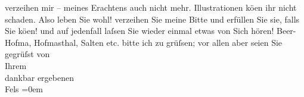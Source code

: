\begin{ledgroupsized}[t]{13cm}
                    verzeihen mir – meines Erachtens auch nicht mehr. Illustrationen kö{\geminationn}en ihr nicht schaden.\pend
           \pstart
           Also leben Sie wohl! verzeihen Sie meine Bitte und erfüllen Sie sie, falls Sie
                        kö{\geminationn}en! und auf jedenfall laſsen Sie wieder
                    einmal etwas von Sich hören! Beer-Hofma{\geminationn}, Hofma{\geminationn}sthal, Salten etc. bitte ich zu
                    grüſsen; vor allen aber seien Sie gegrüſst \pend
           \pstart
           von{\\[\baselineskip]}Ihrem{\\[\baselineskip]}dankbar ergebenen{\\[\baselineskip]}\spacefill\mbox{Fels}\pend
           \leftskip=0em{}          \endnumbering{}\end{ledgroupsized}  \newcommand{\dateiname}{L00488}\newcommand{\titel}{Friedrich M. Fels an Arthur Schnitzler, 19. 9. 1895}\newcommand{\editorInnen}{Martin Anton Müller und Gerd-Hermann Susen}
      
